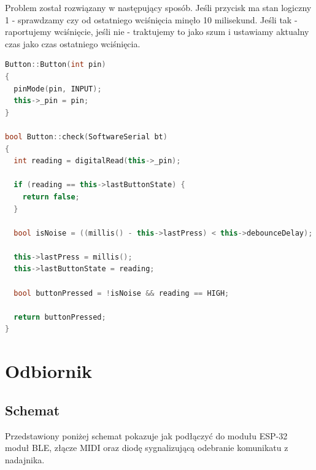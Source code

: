 \documentclass[eng,printmode]{mgr}
\begin{document}
Problem został rozwiązany w następujący sposób. Jeśli przycisk ma stan logiczny 1 - sprawdzamy czy od ostatniego wciśnięcia minęło 10 milisekund. Jeśli tak - raportujemy wciśnięcie, jeśli nie - traktujemy to jako szum i ustawiamy aktualny czas jako czas ostatniego wciśnięcia.

\pagebreak

\begin{lstlisting}[language=C++]
Button::Button(int pin)
{
  pinMode(pin, INPUT);
  this->_pin = pin;
}

bool Button::check(SoftwareSerial bt)
{
  int reading = digitalRead(this->_pin);

  if (reading == this->lastButtonState) {
    return false;
  }

  bool isNoise = ((millis() - this->lastPress) < this->debounceDelay);

  this->lastPress = millis();
  this->lastButtonState = reading;

  bool buttonPressed = !isNoise && reading == HIGH;

  return buttonPressed;
}
\end{lstlisting}

\pagebreak

\section{Odbiornik}
\subsection{Schemat}

Przedstawiony poniżej schemat pokazuje jak podłączyć do modułu ESP-32 moduł BLE, złącze MIDI oraz diodę sygnalizującą odebranie komunikatu z nadajnika.
\end{document}
